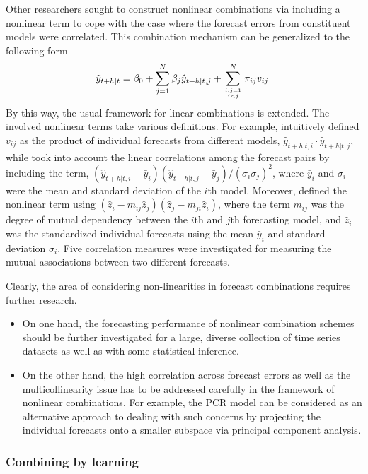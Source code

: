 \documentclass[11pt]{article}
\begin{document}
Other researchers sought to construct nonlinear combinations via including a nonlinear term to cope with the case where the forecast errors from constituent models were correlated. This combination mechanism can be generalized to the following form
\begin{align*}
\tilde{y}_{t+h|t} =\beta_{0}+\sum_{j=1}^{N} \beta_{j} \hat{y}_{t+h|t, j}+\sum_{i,j=1 \atop i<j}^{N}\pi_{ij}v_{i j}.
\end{align*}
By this way, the usual framework for linear combinations is extended. The involved nonlinear terms take various definitions. For example, \cite{Freitas2006-fn} intuitively defined $v_{i j}$ as the product of individual forecasts from different models, $\hat{y}_{t+h|t, i} \cdot \hat{y}_{t+h|t, j}$, while \cite{Adhikari2012-ur} took into account the linear correlations among the forecast pairs by including the term, $(\hat{y}_{t+h|t, i}-\bar{y}_{i})(\hat{y}_{t+h|t, j}-\bar{y}_{j})/(\sigma_{i}\sigma_{j})^2$, where $\bar{y}_{i}$ and $\sigma_{i}$ were the mean and standard deviation of the $i$th model. Moreover, \cite{Adhikari2015-bb} defined the nonlinear term using $\left(\hat{z}_{i}-m_{i j} \hat{z}_{j}\right)\left(\hat{z}_{j}-m_{j i} \hat{z}_{i}\right)$, where the term $m_{i j}$ was the degree of mutual dependency between the $i$th and $j$th forecasting model, and $\hat{z}_{i}$ was the standardized individual forecasts using the mean $\bar{y}_{i}$ and standard deviation $\sigma_{i}$. Five correlation measures were investigated for measuring the mutual associations between two different forecasts.

Clearly, the area of considering non-linearities in forecast combinations requires further research.
\begin{itemize}
  \item On one hand, the forecasting performance of nonlinear combination schemes should be further investigated for a large, diverse collection of time series datasets as well as with some statistical inference.
  \item On the other hand, the high correlation across forecast errors as well as the multicollinearity issue has to be addressed carefully in the framework of nonlinear combinations. For example, the PCR model can be considered as an alternative approach to dealing with such concerns by projecting the individual forecasts onto a smaller subspace via principal component analysis.
\end{itemize}

\subsubsection{Combining by learning}
\label{sec:combining_by_learning}
\end{document}
